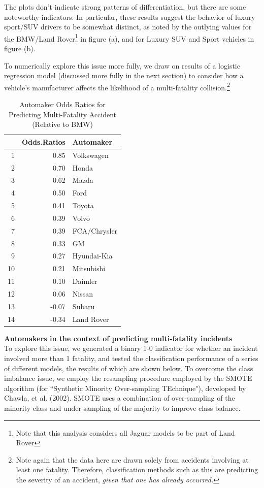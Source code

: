\documentclass[11pt, oneside,titlepage]{article}   	%
\begin{document}
The plots don't indicate strong patterns of differentiation, but there are some noteworthy indicators. In particular, these results suggest the behavior of luxury sport/SUV drivers to be somewhat distinct, as noted by the outlying values for the BMW/Land Rover\footnote{Note that this analysis considers all Jaguar models to be part of Land Rover} in figure (a), and for Luxury SUV and Sport vehicles in figure (b).

To numerically explore this issue more fully, we draw on results of a logistic regression model (discussed more fully in the next section) to consider how a vehicle's manufacturer affects the likelihood of a multi-fatality collision.\footnote{Note again that the data here are drawn solely from accidents involving at least one fatality. Therefore, classification methods such as this are predicting the severity of an accident, \textit{given that one has already occurred.}}

\begin{table}[ht]
\centering
\begin{tabular}{rrl}
  \hline
 & Odds.Ratios & Automaker \\ 
  \hline
1 & 0.85 & Volkswagen \\ 
  2 & 0.70 & Honda \\ 
  3 & 0.62 & Mazda \\ 
  4 & 0.50 & Ford \\ 
  5 & 0.41 & Toyota \\ 
  6 & 0.39 & Volvo \\ 
  7 & 0.39 & FCA/Chrysler \\ 
  8 & 0.33 & GM \\ 
  9 & 0.27 & Hyundai-Kia \\ 
  10 & 0.21 & Mitsubishi \\ 
  11 & 0.10 & Daimler \\ 
  12 & 0.06 & Nissan \\ 
  13 & -0.07 & Subaru \\ 
  14 & -0.34 & Land Rover \\ 
   \hline
\end{tabular}
\caption{Automaker Odds Ratios for Predicting Multi-Fatality Accident (Relative to BMW)} 
\end{table}

\textbf{Automakers in the context of predicting multi-fatality incidents} \\
To explore this issue, we generated a binary 1-0 indicator for whether an incident involved more than 1 fatality, and tested the classification performance of a series of different models, the results of which are shown below. To overcome the class imbalance issue, we employ the resampling procedure employed by the SMOTE algorithm (for ``Synthetic Minority Over-sampling TEchnique"), developed by Chawla, et al. (2002). SMOTE uses a combination of over-sampling of the minority class and under-sampling of the majority to improve class balance. \\
\end{document}
